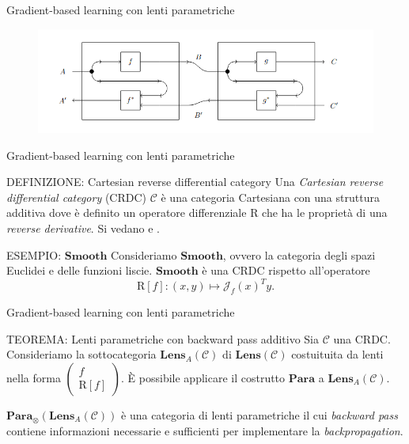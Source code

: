 \documentclass{beamer}
\begin{document}
\begin{frame}{Gradient-based learning con lenti parametriche}
    \begin{figure}
        \begin{center}
            \includegraphics[width=\textwidth]{figures/lens_composition.png}
            \caption*{\cite{cruttwell2022categorical}}
        \end{center}
    \end{figure}
\end{frame}

\begin{frame}{Gradient-based learning con lenti parametriche}
    \begin{block}{DEFINIZIONE: Cartesian reverse differential category}
        Una \textit{Cartesian reverse differential category} (CRDC) $\mathcal{C}$ è una categoria Cartesiana con una struttura additiva dove è definito un operatore differenziale $\mathrm{R}$ che ha le proprietà di una \textit{reverse derivative}.
        Si vedano \cite{cockett2019reverse} e \cite{gavranovic2024fundamental}.
      \end{block}

      \begin{block}{ESEMPIO: $\mathbf{Smooth}$}
        Consideriamo $\mathbf{Smooth}$, ovvero la categoria degli spazi Euclidei e delle funzioni liscie. $\mathbf{Smooth}$ è una CRDC rispetto all'operatore
        \[\mathrm{R}[f]: (x,y) \mapsto \mathcal{J}_f(x)^Ty.\]
      \end{block}
\end{frame}

\begin{frame}{Gradient-based learning con lenti parametriche}
    \begin{block}{TEOREMA: Lenti parametriche con backward pass additivo}
        Sia $\mathcal{C}$ una CRDC. Consideriamo la sottocategoria $\mathbf{Lens}_A(\mathcal{C})$ di $\mathbf{Lens}(\mathcal{C})$ costuituita da lenti nella forma $\left(\begin{smallmatrix} f \\ \mathrm{R}[f]\end{smallmatrix}\right)$. È possibile applicare il costrutto $\mathbf{Para}$ a $\mathbf{Lens}_A(\mathcal{C})$.
    \end{block}   

    $\mathbf{Para}_{\otimes}(\mathbf{Lens}_A(\mathcal{C}))$ è una categoria di lenti parametriche il cui \textit{backward pass} contiene informazioni necessarie e sufficienti per implementare la \textit{backpropagation}.
\end{frame}
\end{document}
